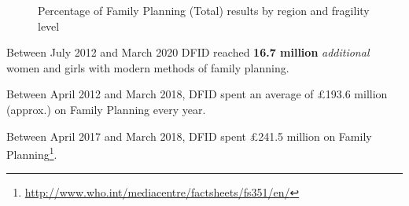 \begin{figure}
	\centering
	\qquad
	\caption{Percentage of Family Planning (Total) results by region and fragility level}%
	\label{fig:family_total}
\end{figure}

Between July 2012 and March 2020 DFID reached \textbf{
16.7 million
} \textsl{additional} women and girls with modern methods of family planning. %

Between April 2012 and March 2018, DFID spent an average of \pounds 193.6 million (approx.) on Family Planning every year. %

Between April 2017 and March 2018, DFID spent \pounds 241.5 million on Family Planning\footnote{\href{http://www.who.int/mediacentre/factsheets/fs351/en/}{http://www.who.int/mediacentre/factsheets/fs351/en/}}. %

